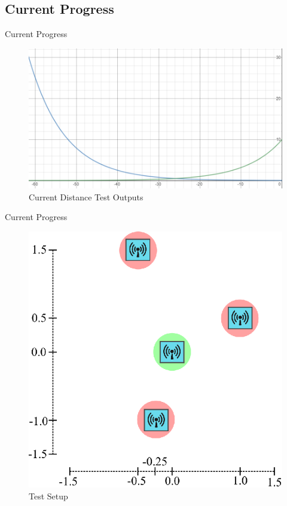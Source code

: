 \documentclass{beamer}
\begin{document}
\subsection{Current Progress}
\begin{frame}{Current Progress}
    \begin{figure}
    \centering
    \includegraphics[scale=0.45]{figs/ScreenShots/GraphRepofRSSI.PNG}
    \caption{Current Distance Test Outputs}
    \label{fig:RSSIOutputTable_Paper}
    \end{figure}
\end{frame}

\begin{frame}{Current Progress}    
	\begin{figure}
    \centering
    \includegraphics[scale=0.9]{figs/inkscape/TestSetup}
    \caption{Test Setup}
    \label{fig:Test Setup}
    \end{figure}
\end{frame}
\end{document}
